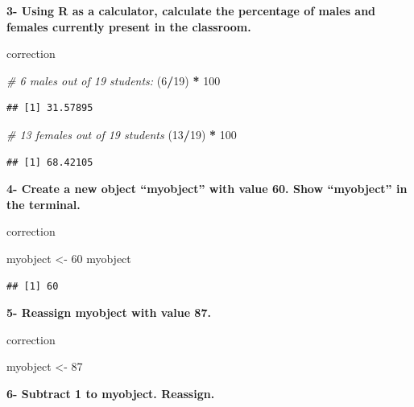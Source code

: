 \documentclass[]{book}
\newenvironment{Shaded}{\begin{snugshade}}{\end{snugshade}}
\newcommand{\CommentTok}[1]{\textcolor[rgb]{0.56,0.35,0.01}{\textit{#1}}}
\newcommand{\DecValTok}[1]{\textcolor[rgb]{0.00,0.00,0.81}{#1}}
\newcommand{\NormalTok}[1]{#1}
\newcommand{\OperatorTok}[1]{\textcolor[rgb]{0.81,0.36,0.00}{\textbf{#1}}}
\newcommand{\StringTok}[1]{\textcolor[rgb]{0.31,0.60,0.02}{#1}}
\begin{document}
\textbf{3- Using R as a calculator, calculate the percentage of males and females currently present in the classroom.}

correction

\begin{Shaded}
\begin{Highlighting}[]
\CommentTok{# 6 males out of 19 students:}
\NormalTok{(}\DecValTok{6}\OperatorTok{/}\DecValTok{19}\NormalTok{) }\OperatorTok{*}\StringTok{ }\DecValTok{100}
\end{Highlighting}
\end{Shaded}

\begin{verbatim}
## [1] 31.57895
\end{verbatim}

\begin{Shaded}
\begin{Highlighting}[]
\CommentTok{# 13 females out of 19 students}
\NormalTok{(}\DecValTok{13}\OperatorTok{/}\DecValTok{19}\NormalTok{) }\OperatorTok{*}\StringTok{ }\DecValTok{100}
\end{Highlighting}
\end{Shaded}

\begin{verbatim}
## [1] 68.42105
\end{verbatim}

\textbf{4- Create a new object ``myobject'' with value 60.
Show ``myobject'' in the terminal.}

correction

\begin{Shaded}
\begin{Highlighting}[]
\NormalTok{myobject <-}\StringTok{ }\DecValTok{60}
\NormalTok{myobject}
\end{Highlighting}
\end{Shaded}

\begin{verbatim}
## [1] 60
\end{verbatim}

\textbf{5- Reassign myobject with value 87.}

correction

\begin{Shaded}
\begin{Highlighting}[]
\NormalTok{myobject <-}\StringTok{ }\DecValTok{87}
\end{Highlighting}
\end{Shaded}

\textbf{6- Subtract 1 to myobject. Reassign.}
\end{document}
